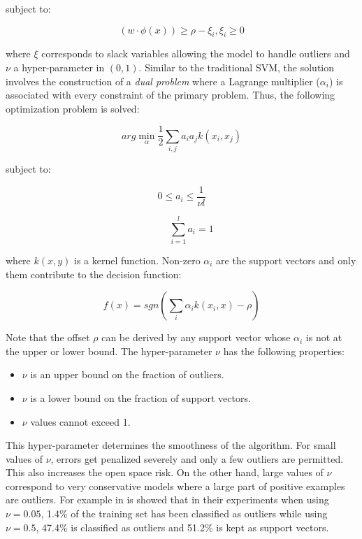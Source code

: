 \nointend subject to:

\begin{equation}
    (w \cdot \phi(x)) \geq \rho - \xi_i, \xi_i \geq 0
\end{equation}

\noindent where $\xi$ corresponds to slack variables allowing the model to handle outliers and $\nu$ a hyper-parameter in $(0,1)$. Similar to the traditional SVM, the solution involves the construction of a \textit{dual problem} where a Lagrange multiplier ($\alpha_i$) is associated with every constraint of the primary problem. Thus, the following optimization problem is solved:

\begin{equation}\label{chap:openset:sec:eq:12}
	arg\min_{\alpha}\frac{1}{2}\sum_{i,j}a_{i}a_{j}k(x_{i},x_{j})
\end{equation}

\nointent subject to:

\begin{equation}\label{chap:openset:sec:eq:4}
	0\leqslant a_{i}\leqslant \frac{1}{\nu l} %
\end{equation}

\begin{equation}\label{chap:openset:sec:eq:5}
	\qquad \sum_{i=1}^{l}a_{i}=1
\end{equation}

\nointend where $k(x,y)$ is a kernel function. Non-zero $\alpha_i$ are the support vectors and only them contribute to the decision function:

\begin{equation}
    f(x) = sgn(\sum_i \alpha_i k(x_i,x) - \rho)
\end{equation}

Note that the offset $\rho$ can be derived by any support vector whose $\alpha_i$ is not at the upper or lower bound. The hyper-parameter $\nu$ has the following properties:

\begin{itemize}
	\item $\nu$ is an upper bound on the fraction of outliers.
	\item $\nu$ is a lower bound on the fraction of support vectors.
	\item $\nu$ values cannot exceed 1.
\end{itemize}

This hyper-parameter determines the smoothness of the algorithm. For small values of $\nu$, errors get penalized severely and only a few outliers are permitted. This also increases the open space risk. On the other hand, large values of $\nu$ correspond to very conservative models where a large part of  positive examples are outliers. For example in \parencite{scholkopf1999estimating} is showed that in their experiments when using $\nu=0.05$, 1.4\% of the training set has been classified as outliers while using $\nu=0.5$, 47.4\% is classified as outliers and 51.2\% is kept as support vectors.

